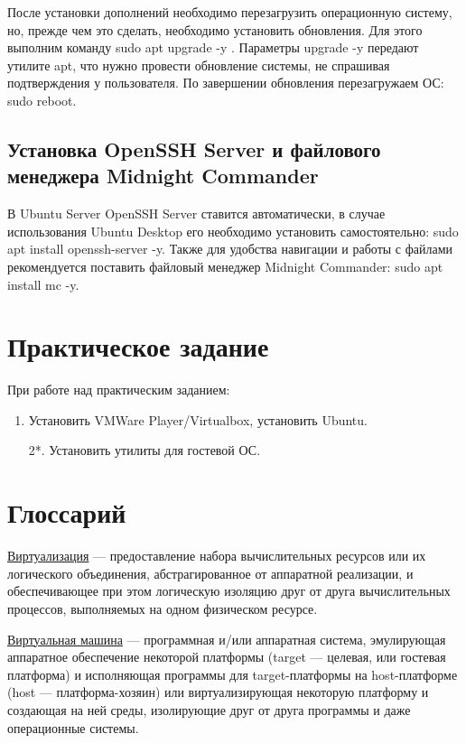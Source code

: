 \documentclass[14pt, a4paper]{article}
\begin{document}
После установки дополнений необходимо перезагрузить операционную систему, но, прежде
чем это сделать, необходимо установить обновления. Для этого выполним команду \colorbox{backcolour}{sudo apt
upgrade -y} . Параметры \colorbox{backcolour}{upgrade -y} передают утилите apt, что нужно провести обновление
системы, не спрашивая подтверждения у пользователя. По завершении обновления перезагружаем
ОС: \colorbox{backcolour}{sudo reboot}.



\subsection*{Установка OpenSSH Server и файлового менеджера
Midnight Commander}
В Ubuntu Server OpenSSH Server ставится автоматически, в случае использования Ubuntu
Desktop его необходимо установить самостоятельно: \colorbox{backcolour}{sudo apt install openssh-server -y}.
Также для удобства навигации и работы с файлами рекомендуется поставить файловый менеджер
Midnight Commander: \colorbox{backcolour}{sudo apt install mc -y}.\newpage


\section*{Практическое задание}
При работе над практическим заданием:
\begin{enumerate}
    \item Установить VMWare Player/Virtualbox, установить Ubuntu.
    \item[2*.] Установить утилиты для гостевой ОС.
\end{enumerate}\newpage

\section*{Глоссарий}
\href{https://ru.wikipedia.org/wiki/Âèðòóàëèçàöèÿ}{Виртуализация} — предоставление набора вычислительных ресурсов или их логического
объединения, абстрагированное от аппаратной реализации, и обеспечивающее при этом логическую
изоляцию друг от друга вычислительных процессов, выполняемых на одном физическом ресурсе.

\href{https://ru.wikipedia.org/wiki/Âèðòóàëüíàÿ_ìàøèíà}{Виртуальная машина} — программная и/или аппаратная система, эмулирующая аппаратное
обеспечение некоторой платформы (target — целевая, или гостевая платформа) и исполняющая
программы для target-платформы на host-платформе (host — платформа-хозяин) или
виртуализирующая некоторую платформу и создающая на ней среды, изолирующие друг от друга
программы и даже операционные системы.
\end{document}

